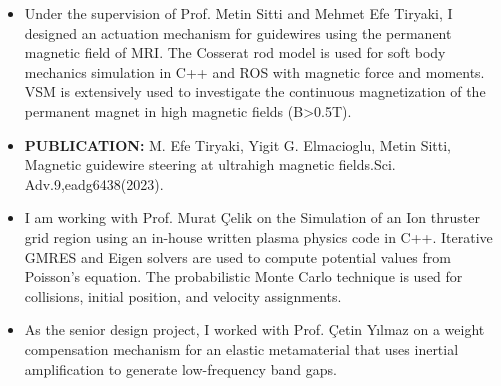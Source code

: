 \documentclass[10pt,a4paper,ragged2e,withhyper]{altacv}
\begin{document}
\begin{paracol}{2}
       
            \begin{itemize}
                \item Under the supervision of Prof. Metin Sitti and Mehmet Efe Tiryaki, I designed an actuation mechanism for guidewires using the permanent magnetic field of MRI. The Cosserat rod model is used for soft body mechanics simulation in C++ and ROS with magnetic force and moments. VSM is extensively used to investigate the continuous magnetization of the permanent magnet in high magnetic fields (B>0.5T). 
                \item \textbf{PUBLICATION: }M. Efe Tiryaki, Yigit G. Elmacioglu, Metin Sitti, Magnetic guidewire steering at ultrahigh magnetic fields.Sci. Adv.9,eadg6438(2023).
            \end{itemize}
            \divider
            
            \begin{itemize}
                \item I am working with Prof. Murat Çelik on the Simulation of an Ion thruster grid region using an in-house written plasma physics code in C++. Iterative GMRES and Eigen solvers are used to compute potential values from Poisson's equation. The probabilistic Monte Carlo technique is used for collisions, initial position, and velocity assignments.
            \end{itemize}
            \divider
            
            \begin{itemize}
                \item As the senior design project, I worked with Prof. Çetin Yılmaz on a weight compensation mechanism for an elastic metamaterial that uses inertial amplification to generate low-frequency band gaps.
            \end{itemize}
            \divider
    \end{paracol}
    \pagebreak
\end{document}
